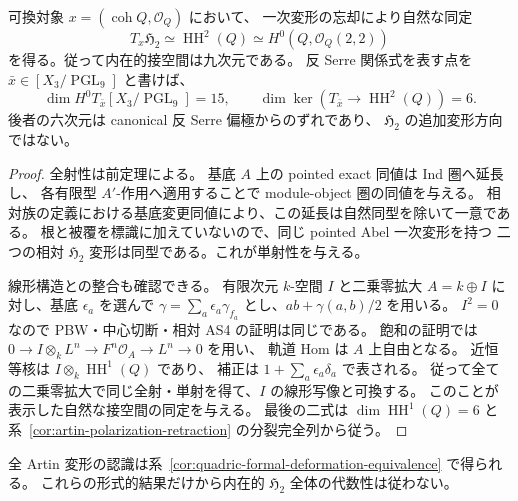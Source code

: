 \begin{corollary}[可換点の内在的な接空間]
\label{cor:quadric-intrinsic-tangent}
可換対象 $x=(\operatorname{coh}Q,\mathcal O_Q)$ において、
一次変形の忘却により自然な同定
\[
 T_x\mathfrak H_2\simeq\operatorname{HH}^2(Q)
      \simeq H^0(Q,\mathcal O_Q(2,2))
\]
を得る。従って内在的接空間は九次元である。
反 Serre 関係式を表す点を $\bar x\in[X_3/\operatorname{PGL}_9]$ と書けば、
\[
 \dim H^0T_{\bar x}[X_3/\operatorname{PGL}_9]=15,
 \qquad \dim\ker(T_{\bar x}\to\operatorname{HH}^2(Q))=6.
\]
後者の六次元は canonical 反 Serre 偏極からのずれであり、
$\mathfrak H_2$ の追加変形方向ではない。
\end{corollary}
\begin{proof}
全射性は前定理による。
基底 $A$ 上の pointed exact 同値は Ind 圏へ延長し、
各有限型 $A'$-作用へ適用することで module-object 圏の同値を与える。
相対族の定義における基底変更同値により、この延長は自然同型を除いて一意である。
根と被覆を標識に加えていないので、同じ pointed Abel 一次変形を持つ
二つの相対 $\mathfrak H_2$ 変形は同型である。これが単射性を与える。

線形構造との整合も確認できる。
有限次元 $k$-空間 $I$ と二乗零拡大 $A=k\oplus I$ に対し、基底 $\epsilon_a$ を選んで
$\gamma=\sum_a\epsilon_a\gamma_{f_a}$ とし、$ab+\gamma(a,b)/2$ を用いる。
$I^2=0$ なので PBW・中心切断・相対 AS4 の証明は同じである。
飽和の証明では $0\to I\otimes_kL^n\to F^n\mathcal O_A\to L^n\to0$ を用い、
軌道 Hom は $A$ 上自由となる。
近恒等核は $I\otimes_k\operatorname{HH}^1(Q)$ であり、
補正は $1+\sum_a\epsilon_a\delta_a$ で表される。
従って全ての二乗零拡大で同じ全射・単射を得て、$I$ の線形写像と可換する。
このことが表示した自然な接空間の同定を与える。
最後の二式は $\dim\operatorname{HH}^1(Q)=6$ と
系~\ref{cor:artin-polarization-retraction} の分裂完全列から従う。
\end{proof}

全 Artin 変形の認識は系~\ref{cor:quadric-formal-deformation-equivalence} で得られる。
これらの形式的結果だけから内在的 $\mathfrak H_2$ 全体の代数性は従わない。
